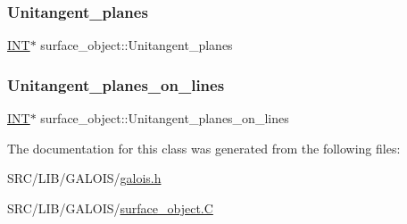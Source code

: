 \mbox{\label{classsurface__object_aaae7006183fe0337646f9419c0763674}} 
\subsubsection{\texorpdfstring{Unitangent\+\_\+planes}{Unitangent\_planes}}
{\footnotesize\ttfamily \mbox{\hyperlink{galois_8h_a09fddde158a3a20bd2dcadb609de11dc}{I\+NT}}$\ast$ surface\+\_\+object\+::\+Unitangent\+\_\+planes}

\mbox{\label{classsurface__object_a8c481aad84aaad8ab805161a9d169429}} 
\subsubsection{\texorpdfstring{Unitangent\+\_\+planes\+\_\+on\+\_\+lines}{Unitangent\_planes\_on\_lines}}
{\footnotesize\ttfamily \mbox{\hyperlink{galois_8h_a09fddde158a3a20bd2dcadb609de11dc}{I\+NT}}$\ast$ surface\+\_\+object\+::\+Unitangent\+\_\+planes\+\_\+on\+\_\+lines}



The documentation for this class was generated from the following files\+:\begin{DoxyCompactItemize}
\item 
S\+R\+C/\+L\+I\+B/\+G\+A\+L\+O\+I\+S/\mbox{\hyperlink{galois_8h}{galois.\+h}}\item 
S\+R\+C/\+L\+I\+B/\+G\+A\+L\+O\+I\+S/\mbox{\hyperlink{surface__object_8_c}{surface\+\_\+object.\+C}}\end{DoxyCompactItemize}
